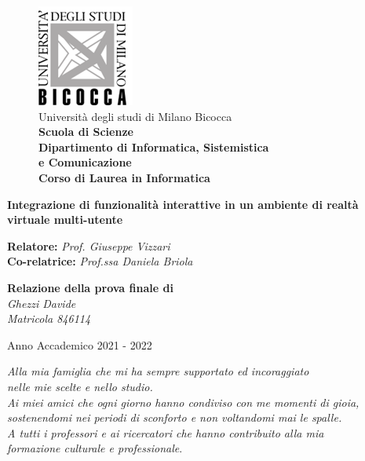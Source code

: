 \documentclass[11pt, openany]{book}
\begin{document}
\begin{titlepage}
\begin{figure}
            \caption*{
                Università degli studi di Milano Bicocca \\
                \textbf{Scuola di Scienze} \\
                \textbf{Dipartimento di Informatica, Sistemistica \\e Comunicazione} \\
                \textbf{Corso di Laurea in Informatica} \\
                }
            \includegraphics[]{Immagini/logo_bicocca.png}
\end{figure}
\begin{center}
        \vspace{2cm}
        \textbf{\Huge
        Integrazione di funzionalità interattive in un ambiente di realtà virtuale multi-utente}
        \vspace{4cm}
        \begin{FlushLeft}
        \Large
            \textbf{Relatore: } \textit{Prof. Giuseppe Vizzari}
            \\
            \textbf{Co-relatrice: } \textit{Prof.ssa Daniela Briola}
        \end{FlushLeft}

        \vspace{2cm}
        \begin{FlushRight}
        \Large
            \textbf{Relazione della prova finale di}
            \\
            \textit{Ghezzi Davide \\ Matricola 846114}
        \end{FlushRight}

        \large \vspace*{\fill} Anno Accademico 2021 - 2022
    \end{center}
\newpage
\end{titlepage}
\newpage
\begin{midpage}
\begin{center}
\begin{FlushRight}
 \textit{Alla mia famiglia che mi ha sempre supportato ed incoraggiato \\nelle mie
scelte e nello studio.
\\Ai miei amici che ogni giorno hanno condiviso con me momenti di gioia, \\sostenendomi nei periodi di sconforto e non voltandomi mai le spalle.
\\A tutti i professori e ai ricercatori che hanno contribuito alla mia \\formazione culturale e professionale}.   
\end{FlushRight}
\end{center}
\end{midpage}
\end{document}
